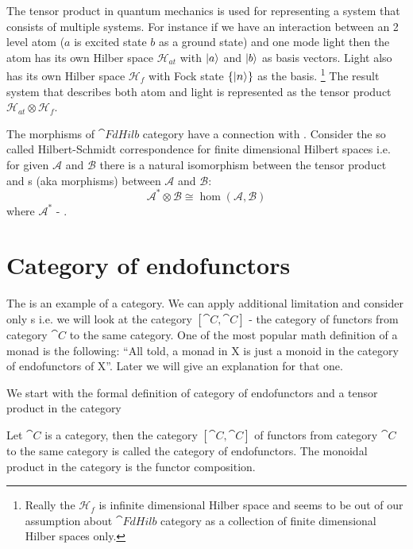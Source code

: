 The tensor product in quantum mechanics is used for
representing a system that consists of multiple systems. For instance
if we have an interaction between an 2 level atom ($a$ is excited
state $b$ as a ground state) and one mode light then the
atom has its own Hilber space $\mathcal{H}_{at}$ with $\ket{a}$ and
$\ket{b}$ as basis 
vectors.  Light also has its own Hilber space $\mathcal{H}_f$ with Fock state
$\{\ket{n}\}$ as the basis.
\footnote{
  Really the $\mathcal{H}_f$ is infinite dimensional Hilber space and
  seems to be out of our assumption about $\cat{FdHilb}$ category as
  a collection of finite dimensional Hilber spaces only.
}
The result system that describes both atom
and light is represented as the tensor product $\mathcal{H}_{at}
\otimes \mathcal{H}_f$.

\begin{remark}
The morphisms of $\cat{FdHilb}$ category have a connection with
. Consider the so called Hilbert-Schmidt
correspondence for finite dimensional Hilbert spaces i.e. for given
$\mathcal{A}$ and $\mathcal{B}$ there is a natural isomorphism between
the tensor product and s (aka morphisms) between
$\mathcal{A}$ and $\mathcal{B}$:
\[
\mathcal{A}^\ast \otimes \mathcal{B} \cong \hom(\mathcal{A}, \mathcal{B})
\]
where $\mathcal{A}^\ast$ - .
\end{remark}

\section{Category of endofunctors}

The  is an example of a category. We can
apply additional limitation and consider only
s i.e. we will look at the category
$[\cat{C}, \cat{C}]$ - the category of functors from category $\cat{C}$ to
the same category. One of the most popular math definition of a monad
is the following: 
``All told, a monad in X is just a monoid in the category of
endofunctors of X''\cite[p.~138]{bib:maclane98}.
Later we will give an explanation for that one.

We start with the formal definition of category of endofunctors and a
tensor product in the category
\begin{definition}
\label{def:category_of_endofunctors}
Let $\cat{C}$ is a category, then  the category $[\cat{C}, \cat{C}]$ of
functors from category $\cat{C}$ to the same category is called the
category of endofunctors. The monoidal product in the category is the
functor composition. 
\end{definition}

